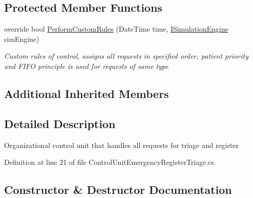 \subsection*{Protected Member Functions}
\begin{DoxyCompactItemize}
\item 
override bool \hyperlink{class_sample_hospital_model_1_1_emergency_1_1_control_unit_emergency_register_triage_af339b7fb7bb71ebdb499aa5257f2a486}{Perform\+Custom\+Rules} (Date\+Time time, \hyperlink{interface_simulation_core_1_1_simulation_classes_1_1_i_simulation_engine}{I\+Simulation\+Engine} sim\+Engine)
\begin{DoxyCompactList}\small\item\em Custom rules of control, assigns all requests in specified order, patient priority and F\+I\+FO principle is used for requests of same type \end{DoxyCompactList}\end{DoxyCompactItemize}
\subsection*{Additional Inherited Members}


\subsection{Detailed Description}
Organizational control unit that handles all requests for triage and register 



Definition at line 21 of file Control\+Unit\+Emergency\+Register\+Triage.\+cs.



\subsection{Constructor \& Destructor Documentation}
